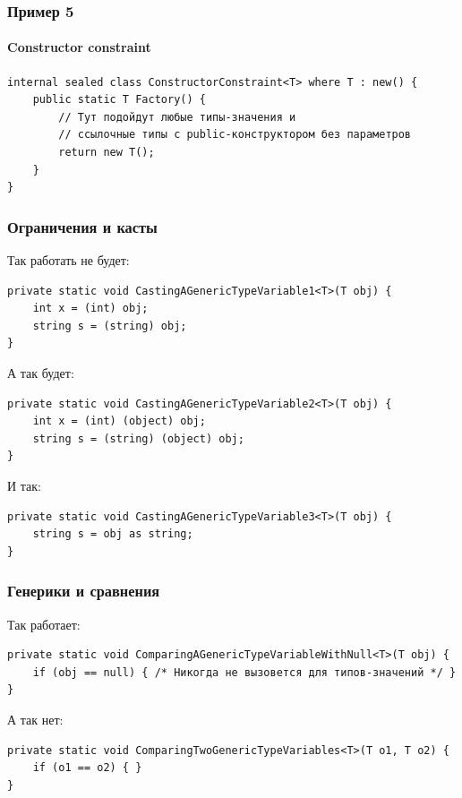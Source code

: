 \documentclass[xetex,mathserif,serif]{beamer}
\begin{document}
	\begin{frame}[fragile]
		\frametitle{Пример 5}
		\framesubtitle{Constructor constraint}
		\begin{footnotesize}
			\begin{verbatim}
internal sealed class ConstructorConstraint<T> where T : new() {
    public static T Factory() {
        // Тут подойдут любые типы-значения и 
        // ссылочные типы с public-конструктором без параметров
        return new T();
    }
}
			\end{verbatim}
		\end{footnotesize}
	\end{frame}

	\begin{frame}[fragile]
		\frametitle{Ограничения и касты}
		Так работать не будет:
		\begin{footnotesize}
			\begin{verbatim}
private static void CastingAGenericTypeVariable1<T>(T obj) {
    int x = (int) obj; 
    string s = (string) obj;
}
			\end{verbatim}
		\end{footnotesize}
		\vspace{5mm}
		А так будет:
		\begin{footnotesize}
			\begin{verbatim}
private static void CastingAGenericTypeVariable2<T>(T obj) {
    int x = (int) (object) obj;
    string s = (string) (object) obj; 
}
			\end{verbatim}
		\end{footnotesize}
		\vspace{5mm}
		И так:
		\begin{footnotesize}
			\begin{verbatim}
private static void CastingAGenericTypeVariable3<T>(T obj) {
    string s = obj as string;
}
			\end{verbatim}
		\end{footnotesize}
	\end{frame}

	\begin{frame}[fragile]
		\frametitle{Генерики и сравнения}
		Так работает:
		\begin{footnotesize}
			\begin{verbatim}
private static void ComparingAGenericTypeVariableWithNull<T>(T obj) {
    if (obj == null) { /* Никогда не вызовется для типов-значений */ }
}
			\end{verbatim}
		\end{footnotesize}
		\vspace{5mm}
		А так нет:
		\begin{footnotesize}
			\begin{verbatim}
private static void ComparingTwoGenericTypeVariables<T>(T o1, T o2) {
    if (o1 == o2) { }
}
			\end{verbatim}
		\end{footnotesize}
	\end{frame}
\end{document}
